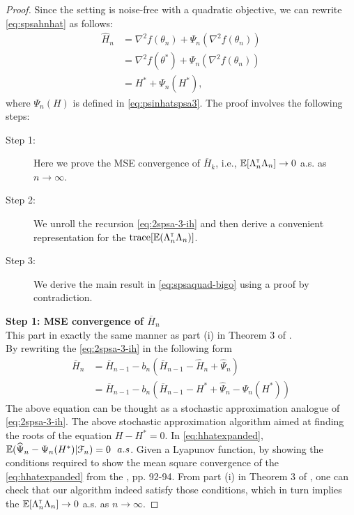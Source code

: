 \begin{proof}
Since the setting is noise-free with a quadratic objective, we can rewrite \eqref{eq:spsahnhat} as follows:
\begin{align}
 \widehat H_n &=    \nabla^2 f(\theta_n) +\Psi_{n}(\nabla^2 f(\theta_n))\nonumber\\
 &=    \nabla^2 f(\theta^*) +\Psi_{n}(\nabla^2 f(\theta_n))\nonumber\\
 &=    H^* +\Psi_{n}(H^* ),\label{eq:spsahnhat-ext}
\end{align}
where $\Psi_n(H)$ is defined in \eqref{eq:psinhatspsa3}.
The proof involves the following steps:
\begin{description}
  \item[Step 1:] Here we prove the MSE convergence of $\overline H_k$, i.e., $\mathbb{E} [\Lambda_n^\mathsf{\scriptscriptstyle T} \Lambda_n] \rightarrow 0$ a.s. as $n\rightarrow \infty$.
  \item[Step 2:] We unroll the recursion \eqref{eq:2spsa-3-ih} and then derive a convenient representation for the  $\text{trace}[\mathbb{E} (\Lambda_n ^\mathsf{\scriptscriptstyle T} \Lambda_n)]$.
  \item[Step 3:] We derive the main result in \eqref{eq:spsaquad-bigo} using a proof by contradiction. 
\end{description}
\noindent\textbf{Step 1: MSE convergence of $\overline H_n$} \\
This part in exactly the same manner as part (i) in Theorem 3 of \cite{spall-jacobian}.\\
By rewriting the \eqref{eq:2spsa-3-ih} in the following form
\begin{align}\label{eq:hhatexpanded}
\overline H_{n} &= \overline H_{n-1} - b_{n} ( \overline H_{n-1} - \widehat H_n + \widehat \Psi_n)\nonumber\\
&= \overline H_{n-1} - b_{n} ( \overline H_{n-1} - H^* + \widehat \Psi_n - \Psi_n (H^*))
\end{align}
The above equation can be thought as a stochastic approximation analogue of \eqref{eq:2spsa-3-ih}. The above stochastic approximation algorithm aimed at finding the roots of the equation $H-H^*=0$. In \eqref{eq:hhatexpanded}, $\mathbb{E} (\widehat \Psi_n - \Psi_n (H^*) | \mathcal{F}_n) = 0 \,\,\ a.s$.  Given a Lyapunov function, by showing the conditions required to show   the mean square convergence of the \eqref{eq:hhatexpanded} from the \cite{nevel1973stochastic}, pp. 92-94. From part (i) in Theorem 3 of \cite{spall-jacobian}, one can check that our algorithm indeed satisfy those conditions,  which in turn implies the $\mathbb{E} [\Lambda_n^\mathsf{\scriptscriptstyle T} \Lambda_n] \rightarrow 0$ a.s. as $n\rightarrow \infty$. 



\end{proof}
